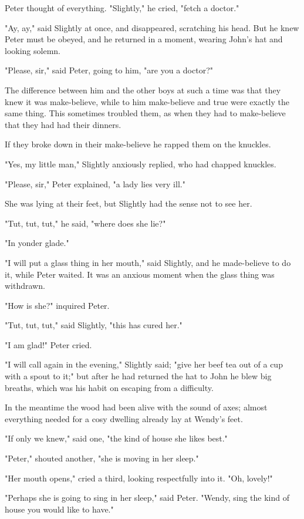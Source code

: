 Peter thought of everything.
"Slightly," he cried, "fetch a doctor."

"Ay, ay," said Slightly at once, and disappeared, scratching his head.
But he knew Peter must be obeyed, and he returned in a moment, wearing John's hat and looking solemn.

"Please, sir," said Peter, going to him, "are you a doctor?"

The difference between him and the other boys at such a time was that they knew it was make-believe, while to him make-believe and true were exactly the same thing.
This sometimes troubled them, as when they had to make-believe that they had had their dinners.

If they broke down in their make-believe he rapped them on the knuckles.

"Yes, my little man," Slightly anxiously replied, who had chapped knuckles.

"Please, sir," Peter explained, "a lady lies very ill."

She was lying at their feet, but Slightly had the sense not to see her.

"Tut, tut, tut," he said, "where does she lie?"

"In yonder glade."

"I will put a glass thing in her mouth," said Slightly, and he made-believe to do it, while Peter waited.
It was an anxious moment when the glass thing was withdrawn.

"How is she?\@" inquired Peter.

"Tut, tut, tut," said Slightly, "this has cured her."

"I am glad!\@" Peter cried.

"I will call again in the evening," Slightly said;
"give her beef tea out of a cup with a spout to it;" but after he had returned the hat to John he blew big breaths, which was his habit on escaping from a difficulty.

In the meantime the wood had been alive with the sound of axes;
almost everything needed for a cosy dwelling already lay at Wendy's feet.

"If only we knew," said one, "the kind of house she likes best."

"Peter," shouted another, "she is moving in her sleep."

"Her mouth opens," cried a third, looking respectfully into it.
"Oh, lovely!"

"Perhaps she is going to sing in her sleep," said Peter.
"Wendy, sing the kind of house you would like to have."

